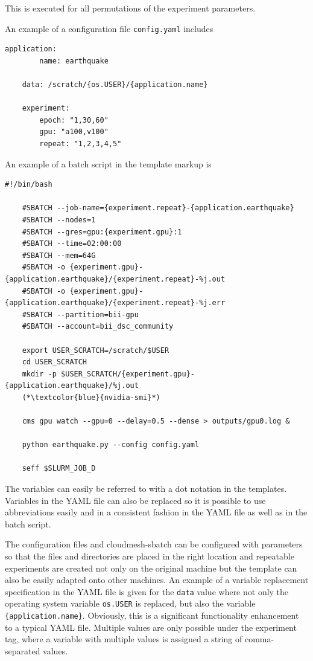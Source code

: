 \documentclass[utf8]{FrontiersinVancouver} %
\begin{document}
This is executed for all permutations of the experiment parameters.

An example of a configuration file \verb|config.yaml| includes


{\fontsize{6pt}{6pt}\selectfont
\begin{lstlisting}[breaklines=true]
    application:
        name: earthquake

    data: /scratch/{os.USER}/{application.name}
       
    experiment:
        epoch: "1,30,60"
        gpu: "a100,v100"
        repeat: "1,2,3,4,5"
\end{lstlisting}
}


An example of a batch script in the template markup is

{\fontsize{6pt}{6pt}\selectfont
\begin{lstlisting}[style=sh]
    #!/bin/bash

    #SBATCH --job-name={experiment.repeat}-{application.earthquake}
    #SBATCH --nodes=1
    #SBATCH --gres=gpu:{experiment.gpu}:1
    #SBATCH --time=02:00:00
    #SBATCH --mem=64G
    #SBATCH -o {experiment.gpu}-{application.earthquake}/{experiment.repeat}-%j.out
    #SBATCH -o {experiment.gpu}-{application.earthquake}/{experiment.repeat}-%j.err
    #SBATCH --partition=bii-gpu
    #SBATCH --account=bii_dsc_community

    export USER_SCRATCH=/scratch/$USER
    cd USER_SCRATCH
    mkdir -p $USER_SCRATCH/{experiment.gpu}-{application.earthquake}/%j.out
    (*\textcolor{blue}{nvidia-smi}*)

    cms gpu watch --gpu=0 --delay=0.5 --dense > outputs/gpu0.log &

    python earthquake.py --config config.yaml

    seff $SLURM_JOB_D
\end{lstlisting}
}

The variables can easily be referred to with a dot notation in the templates.  Variables in the YAML file can also be replaced so it is possible to use abbreviations easily and in a consistent fashion in the YAML file as well as in the batch script.

The configuration files and cloudmesh-sbatch can be configured with parameters so that the files and directories are placed in the right location and repeatable experiments are created not only on the original machine but the template can also be easily adapted onto other machines. An example of a variable replacement specification in the YAML file is given for the \verb|data| value where not only the operating system variable \verb|os.USER| is replaced, but also the variable \verb|{application.name}|. Obviously, this is a significant functionality enhancement to a typical YAML file.  Multiple values are only possible under the experiment tag, where a variable with multiple values is assigned a string of comma-separated values.
\end{document}
